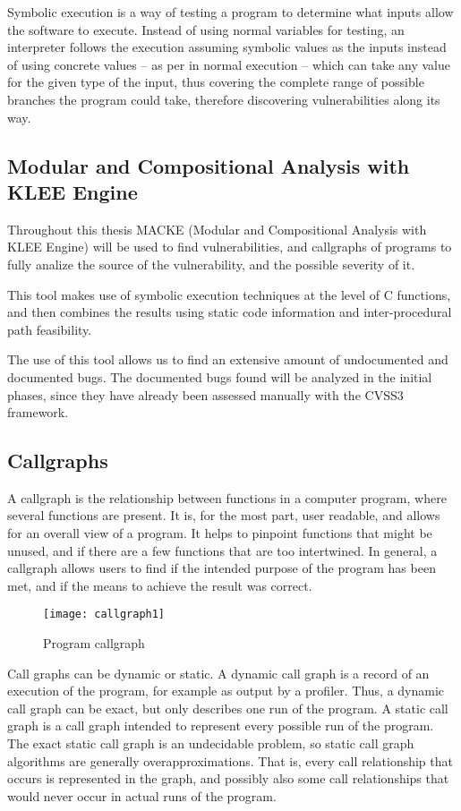 Symbolic execution is a way of testing a program to determine what inputs allow the software to execute. Instead of using normal variables for testing, an interpreter follows the execution assuming symbolic values as the inputs instead of using concrete values -- as per in normal execution -- which can take any value for the given type of the input, thus covering the complete range of possible branches the program could take, therefore discovering vulnerabilities along its way.

\subsection{Modular and Compositional Analysis with KLEE Engine}

Throughout this thesis MACKE (Modular and Compositional Analysis with KLEE Engine)\parencite{ognawala} will be used to find vulnerabilities, and callgraphs of programs to fully analize the source of the vulnerability, and the possible severity of it.

This tool makes use of symbolic execution techniques at the level of C functions, and then combines the results using static code information and inter-procedural path feasibility\parencite{ognawala}.

The use of this tool allows us to find an extensive amount of undocumented and documented bugs. The documented bugs found will be analyzed in the initial phases, since they have already been assessed manually with the CVSS3 framework.

\subsection{Callgraphs}

A callgraph\parencite{dataFlow} is the relationship between functions in a computer program, where several functions are present. It is, for the most part, user readable, and allows for an overall view of a program. It helps to pinpoint functions that might be unused, and if there are a few functions that are too intertwined. In general, a callgraph allows users to find if the intended purpose of the program has been met, and if the means to achieve the result was correct.

\begin{figure}
	\caption{Program callgraph}
	\centering
	\texttt{[image: callgraph1]}
\end{figure}

Call graphs can be dynamic or static. A dynamic call graph is a record of an execution of the program, for example as output by a profiler. Thus, a dynamic call graph can be exact, but only describes one run of the program. A static call graph is a call graph intended to represent every possible run of the program. The exact static call graph is an undecidable problem, so static call graph algorithms are generally overapproximations. That is, every call relationship that occurs is represented in the graph, and possibly also some call relationships that would never occur in actual runs of the program.

